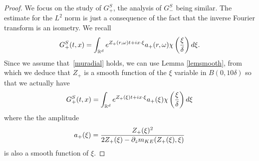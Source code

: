 \documentclass[11pt]{amsart}
\numberwithin{equation}{section}
\begin{document}
 \begin{proof}
 We focus on the study of $G^S_{+}$, the analysis of $G^S_{-}$ being similar. The estimate for the $L^2$ norm is just a consequence of the fact that the inverse
 Fourier transform is an isometry.
   We recall 
   $$ G^S_{+}(t,x) = \int_{\mathbb{R}^d} e^{Z_{+}(r, \omega) t + i x \cdot \xi} a_{+}(r,\omega) \chi\left({\xi \over \delta} \right)
    d \xi. $$
    Since we assume that~\eqref{muradial} holds, we can use Lemma \ref{lemsmooth}, from which we deduce that $Z_{+}$ is 
     a smooth function of the $\xi$ variable in $B(0, 10 \delta)$  so that we actually have 
     $$  G^S_{+}(t,x) = \int_{\mathbb{R}^d} e^{Z_{+}(\xi) t + i x \cdot \xi} a_{+}(\xi) \chi\left({\xi \over \delta} \right)
    d \xi$$
    where the  the amplitude
    $$ a_{+}(\xi)=  { Z_{+}(\xi)^2 \over  2 Z_{+}(\xi) - \partial_{z}m_{KE}(Z_{+}(\xi), \xi)}$$
    is also a smooth function of $\xi$.


\end{proof}
\end{document}
